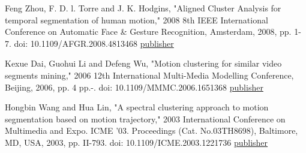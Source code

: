 \documentclass[12pt, a4paper, oneside]{Thesis} %
\begin{document}
{%


 
 
% 
% 



\appendix %





\backmatter

\label{Bibliography}

\begin{thebibliography}{999}

Feng Zhou, F. D. l. Torre and J. K. Hodgins, "Aligned Cluster Analysis for temporal segmentation of human motion," 2008 8th IEEE International Conference on Automatic Face \& Gesture Recognition, Amsterdam, 2008, pp. 1-7.
doi: 10.1109/AFGR.2008.4813468 \href{http://ieeexplore.ieee.org/stamp/stamp.jsp?tp=&arnumber=4813468&isnumber=4813301}{publisher}

Kexue Dai, Guohui Li and Defeng Wu, "Motion clustering for similar video segments mining," 2006 12th International Multi-Media Modelling Conference, Beijing, 2006, pp. 4 pp.-.
doi: 10.1109/MMMC.2006.1651368
\href{http://ieeexplore.ieee.org/stamp/stamp.jsp?tp=&arnumber=1651368&isnumber=34625}{publisher}

Hongbin Wang and Hua Lin, "A spectral clustering approach to motion segmentation based on motion trajectory," 2003 International Conference on Multimedia and Expo. ICME '03. Proceedings (Cat. No.03TH8698), Baltimore, MD, USA, 2003, pp. II-793.
doi: 10.1109/ICME.2003.1221736
\href{http://ieeexplore.ieee.org/stamp/stamp.jsp?tp=&arnumber=1221736&isnumber=27437}{publisher}


\end{thebibliography}}
\end{document}
